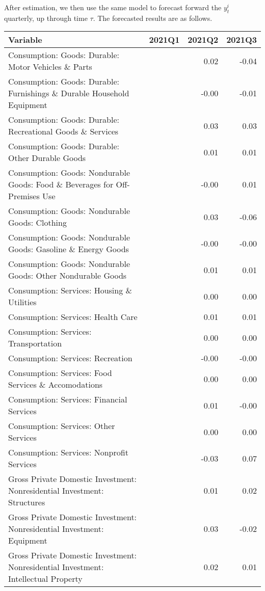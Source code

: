 \documentclass[11pt, letterpaper]{article}\usepackage[]{graphicx}\usepackage[]{color}
\begin{document}
After estimation, we then use the same model to forecast forward the $y^i_t$ quarterly, up through time $\tau$. 
The forecasted results are as follows.
\begin{table}[H]
\centering
\begingroup\scriptsize
\begin{tabular}{lrrr}
  \hline
Variable & 2021Q1 & 2021Q2 & 2021Q3 \\ 
  \hline
Consumption: Goods: Durable: Motor Vehicles \& Parts &  & 0.02 & -0.04 \\ 
  Consumption: Goods: Durable: Furnishings \& Durable Household Equipment &  & -0.00 & -0.01 \\ 
  Consumption: Goods: Durable: Recreational Goods \& Services &  & 0.03 & 0.03 \\ 
  Consumption: Goods: Durable: Other Durable Goods &  & 0.01 & 0.01 \\ 
  Consumption: Goods: Nondurable Goods: Food \& Beverages for Off-Premises Use &  & -0.00 & 0.01 \\ 
  Consumption: Goods: Nondurable Goods: Clothing &  & 0.03 & -0.06 \\ 
  Consumption: Goods: Nondurable Goods: Gasoline \& Energy Goods &  & -0.00 & -0.00 \\ 
  Consumption: Goods: Nondurable Goods: Other Nondurable Goods &  & 0.01 & 0.01 \\ 
  Consumption: Services: Housing \& Utilities &  & 0.00 & 0.00 \\ 
  Consumption: Services: Health Care &  & 0.01 & 0.01 \\ 
  Consumption: Services: Transportation &  & 0.00 & 0.00 \\ 
  Consumption: Services: Recreation &  & -0.00 & -0.00 \\ 
  Consumption: Services: Food Services \& Accomodations &  & 0.00 & 0.00 \\ 
  Consumption: Services: Financial Services &  & 0.01 & -0.00 \\ 
  Consumption: Services: Other Services &  & 0.00 & 0.00 \\ 
  Consumption: Services: Nonprofit Services &  & -0.03 & 0.07 \\ 
  Gross Private Domestic Investment: Nonresidential Investment: Structures &  & 0.01 & 0.02 \\ 
  Gross Private Domestic Investment: Nonresidential Investment: Equipment &  & 0.03 & -0.02 \\ 
  Gross Private Domestic Investment: Nonresidential Investment: Intellectual Property &  & 0.02 & 0.01 \\ 

\end{tabular}
\end{table}
\end{document}
